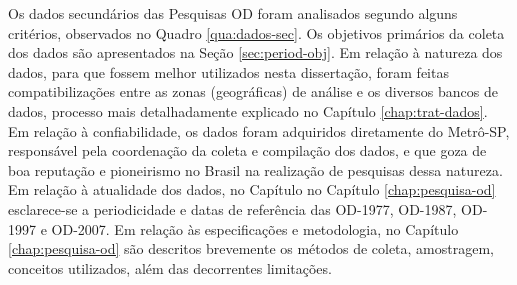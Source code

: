 Os dados secundários das Pesquisas OD foram analisados segundo alguns critérios, observados no Quadro \ref{qua:dados-sec}. Os objetivos primários da coleta dos dados são apresentados na Seção \ref{sec:period-obj}. Em relação à natureza dos dados, para que fossem melhor utilizados nesta dissertação, foram feitas compatibilizações entre as zonas (geográficas) de análise e os diversos bancos de dados, processo mais detalhadamente explicado no Capítulo \ref{chap:trat-dados}. Em relação à confiabilidade, os dados foram adquiridos diretamente do Metrô-SP, responsável pela coordenação da coleta e compilação dos dados, e que goza de boa reputação e pioneirismo no Brasil na realização de pesquisas dessa natureza. Em relação à atualidade dos dados, no Capítulo no Capítulo \ref{chap:pesquisa-od} esclarece-se a periodicidade e datas de referência das OD-1977, OD-1987, OD-1997 e OD-2007. Em relação às especificações e metodologia, no Capítulo \ref{chap:pesquisa-od} são descritos brevemente os métodos de coleta, amostragem, conceitos utilizados, além das decorrentes limitações.

\begin{quadro}[htb]
\end{quadro}

